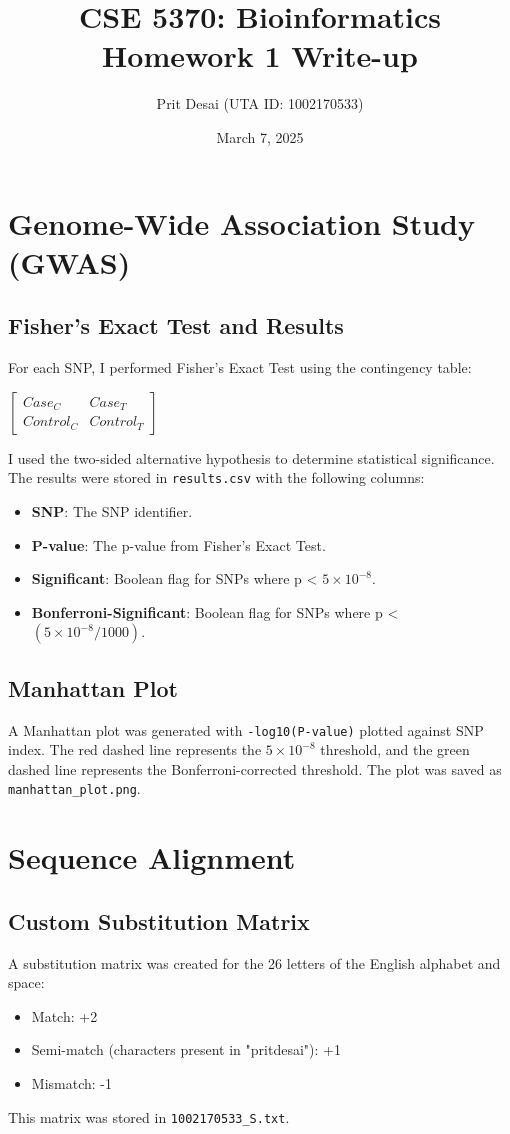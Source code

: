 \documentclass{article}
\title{CSE 5370: Bioinformatics Homework 1 Write-up}
\author{Prit Desai (UTA ID: 1002170533)}
\date{March 7, 2025}
\begin{document}
\maketitle

\section{Genome-Wide Association Study (GWAS)}

\subsection{Fisher's Exact Test and Results}
For each SNP, I performed Fisher's Exact Test using the contingency table:
\begin{center}
$\begin{bmatrix} Case_C & Case_T \\ Control_C & Control_T \end{bmatrix}$
\end{center}
I used the two-sided alternative hypothesis to determine statistical significance. The results were stored in \texttt{results.csv} with the following columns:
\begin{itemize}
    \item \textbf{SNP}: The SNP identifier.
    \item \textbf{P-value}: The p-value from Fisher's Exact Test.
    \item \textbf{Significant}: Boolean flag for SNPs where p < $5 \times 10^{-8}$.
    \item \textbf{Bonferroni-Significant}: Boolean flag for SNPs where p < $(5 \times 10^{-8} / 1000)$.
\end{itemize}

\subsection{Manhattan Plot}
A Manhattan plot was generated with \texttt{-log10(P-value)} plotted against SNP index. The red dashed line represents the $5 \times 10^{-8}$ threshold, and the green dashed line represents the Bonferroni-corrected threshold. The plot was saved as \texttt{manhattan\_plot.png}.

\section{Sequence Alignment}

\subsection{Custom Substitution Matrix}
A substitution matrix was created for the 26 letters of the English alphabet and space:
\begin{itemize}
    \item Match: +2
    \item Semi-match (characters present in "pritdesai"): +1
    \item Mismatch: -1
\end{itemize}
This matrix was stored in \texttt{1002170533\_S.txt}.
\end{document}
